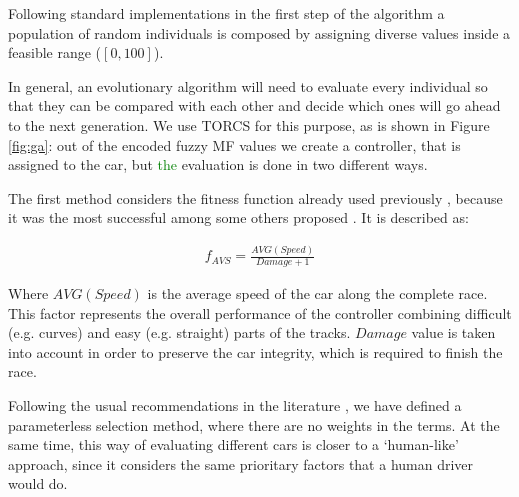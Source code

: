 \documentclass[10pt,journal,compsoc]{IEEEtran}
\begin{document}



Following standard implementations in the first step of the algorithm \cite{salem_evo18} a
population of random individuals is composed by assigning diverse values inside a feasible range ($[0,100]$).

In general, an evolutionary algorithm will need to evaluate every
individual so that they can be compared with each other and decide
which ones will go ahead to the next generation. We use TORCS for this
purpose, as is shown in Figure \ref{fig:ga}: out of the encoded fuzzy
MF values we create a controller, that is assigned to the car, but
\textcolor{green}{the} evaluation is done in two different ways.

The first method considers the fitness function already used
previously \cite{salem_cig2018}, because it was the most successful 
among some others proposed \cite{salem_evo18}. It is described as: 

 \begin{equation} \label{fit_avg}
 	\begin{array}{lll}
 		f_{AVS}= \frac{AVG(Speed)}{Damage+1}
 	\end{array}
 \end{equation}	

Where $AVG(Speed)$ is the average speed of the car along the complete
race. This factor represents the overall performance of the controller
combining difficult (e.g. curves) and easy (e.g. straight) parts of
the tracks. $Damage$ value is taken into account in order to preserve
the car integrity, which is required to finish the race. 

Following the usual recommendations in the literature
\cite{Harik-ParameterLess99}, we have defined a parameterless
selection method, where there are no weights in the terms.
At the same time, this way of evaluating different cars is closer to a `human-like'
approach, since it considers the same prioritary factors that a human
driver would do.
\end{document}

